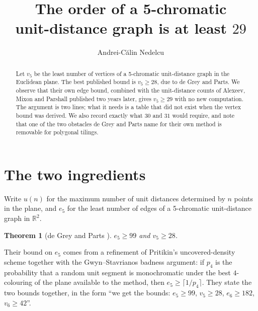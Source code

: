\documentclass[11pt,reqno]{amsart}
\theoremstyle{plain}
\newtheorem{theorem}{Theorem}
\theoremstyle{definition}
\newcommand{\R}{\mathbb{R}}
\begin{document}
\title[A 5-chromatic unit-distance graph has at least 29 vertices]
      {The order of a 5-chromatic\\ unit-distance graph is at least $29$}

\author{Andrei-C\u{a}lin Nedelcu}
\address{\textbf{[AFFILIATION TO BE SUPPLIED]}}


\begin{abstract}
Let $v_5$ be the least number of vertices of a 5-chromatic unit-distance graph in
the Euclidean plane. The best published bound is $v_5 \ge 28$, due to de Grey and
Parts. We observe that their own edge bound, combined with the unit-distance
counts of Alexeev, Mixon and Parshall published two years later, gives
$v_5 \ge 29$ with no new computation. The argument is two lines; what it needs is
a table that did not exist when the vertex bound was derived. We also record
exactly what $30$ and $31$ would require, and note that one of the two obstacles
de Grey and Parts name for their own method is removable for polygonal tilings.
\end{abstract}

\maketitle

\section{The two ingredients}

Write $u(n)$ for the maximum number of unit distances determined by $n$ points in
the plane, and $e_5$ for the least number of edges of a 5-chromatic
unit-distance graph in $\R^2$.

\begin{theorem}[de Grey and Parts \cite{dGP}]\label{thm:A}
$e_5 \ge 99$ and $v_5 \ge 28$.
\end{theorem}

Their bound on $e_5$ comes from a refinement of Pritikin's uncovered-density
scheme together with the Gwyn--Stavrianos badness argument: if $p_4$ is the
probability that a random unit segment is monochromatic under the best
$4$-colouring of the plane available to the method, then $e_5 \ge \lceil 1/p_4
\rceil$. They state the two bounds together, in the form ``we get the bounds:
$e_5 \ge 99$, $v_5 \ge 28$, $e_6 \ge 182$, $v_6 \ge 42$''.
\end{document}
